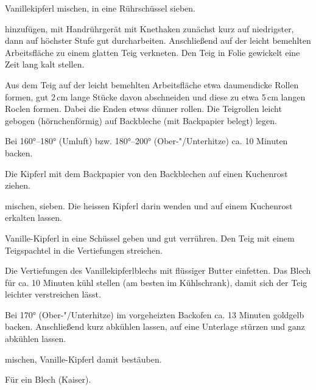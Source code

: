 \begin{recipe}{Vanillekipferl}
  mischen, in eine Rührschüssel sieben.
  
  hinzufügen, mit Handrührgerät mit Knethaken zunächst kurz auf
  niedrigster, dann auf höchster Stufe gut durcharbeiten.
  Anschließend auf der leicht bemehlten Arbeitsfläche zu einem glatten
  Teig verkneten. Den Teig in Folie gewickelt eine Zeit lang kalt
  stellen.

  Aus dem Teig auf der leicht bemehlten Arbeitsfläche etwa daumendicke
  Rollen formen, gut 2\,cm lange Stücke davon abschneiden und diese zu
  etwa 5\,cm langen Roclen formen. Dabei die Enden etwss dünner rollen.
  Die Teigrollen leicht gebogen (hörnchenförmig) auf Backbleche (mit
  Backpapier belegt) legen.

  Bei 160°--180° (Umluft) bzw. 180°--200° (Ober-"/Unterhitze) ca. 10 Minuten backen.

  Die Kipferl mit dem Backpapier von den Backblechen auf einen
  Kuchenrost ziehen.
  
  mischen, sieben. Die heissen Kipferl darin wenden und auf einem
  Kuchenrost erkalten lassen.
\end{recipe}



\begin{recipe}{Vanille-Kipferl}
  in eine Schüssel geben und gut verrühren. Den Teig mit einem
  Teigspachtel in die Vertiefungen streichen.

  Die Vertiefungen des Vanillekipferlblechs mit flüssiger Butter
  einfetten. Das Blech für ca. 10 Minuten kühl stellen (am besten im
  Kühlschrank), damit sich der Teig leichter verstreichen lässt.
  
  Bei 170° (Ober-"/Unterhitze) im vorgeheizten Backofen ca. 13 Minuten
  goldgelb backen. Anschließend kurz abkühlen lassen, auf eine Unterlage
  stürzen und ganz abkühlen lassen.
  
  mischen, Vanille-Kipferl damit bestäuben.

  Für ein Blech (Kaiser).
\end{recipe}



